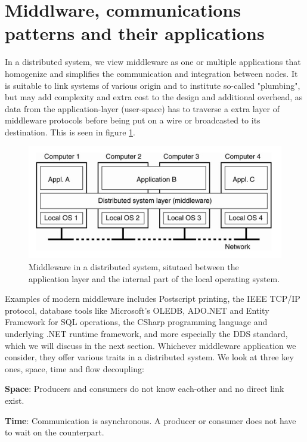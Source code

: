 \section{Middlware, communications patterns and their applications}

In a distributed system, we view middleware as one or multiple applications that homogenize and simplifies the communication and integration between nodes. It is suitable to link systems of various origin and to institute so-called "plumbing", but may add complexity and extra cost to the design and additional overhead, as data from the application-layer (user-space) has to traverse a extra layer of middleware protocols before being put on a wire or broadcasted to its destination. This is seen in figure \ref{fig:middleware}. 

\begin{figure}[h!]\label{}
	\centering
	\includegraphics[scale=0.5]{middleware/middlewaredist.png}
	\caption{Middleware in a distributed system, situtaed between the application layer and the internal part of the local operating system.}
	\label{fig:middleware}
\end{figure}

\noindent Examples of modern middleware includes Postscript printing, the IEEE TCP/IP protocol, database tools like Microsoft's OLEDB, ADO.NET and Entity Framework for SQL operations, the CSharp programming language and underlying .NET runtime framework, and more especially the DDS standard, which we will discuss in the next section. Whichever middleware application we consider, they offer various traits in a distributed system. We look at three key ones, space, time and flow decoupling:

\noindent \textbf{Space}: Producers and consumers do not know each-other and no direct link exist.

\noindent \textbf{Time}: Communication is asynchronous. A producer or consumer does not have to wait on the counterpart.

